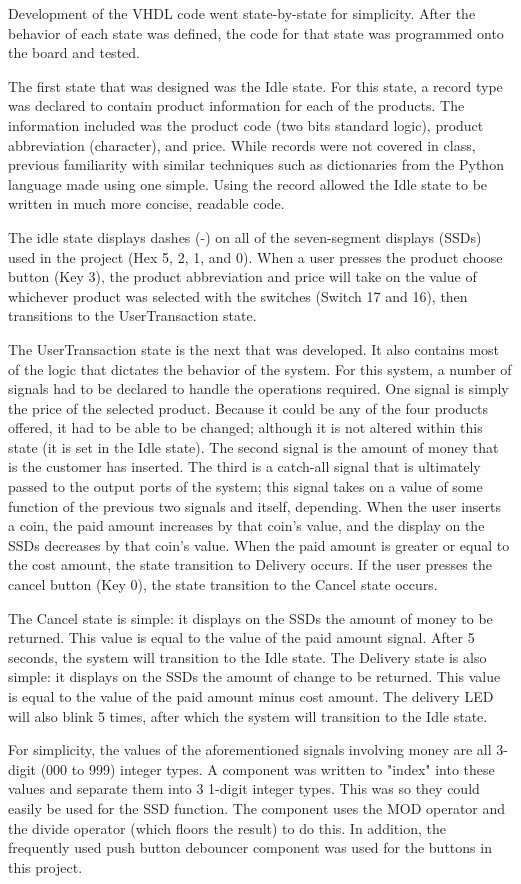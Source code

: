 \documentclass[12pt]{article}
\begin{document}
Development of the VHDL code went state-by-state for simplicity.  After the behavior of each state was defined, the code for that state was programmed onto the board and tested.\par
The first state that was designed was the Idle state.  For this state, a record type was declared to contain product information for each of the products.  The information included was the product code (two bits standard logic), product abbreviation (character), and price.  While records were not covered in class, previous familiarity with similar techniques such as dictionaries from the Python language made using one simple.  Using the record allowed the Idle state to be written in much more concise, readable code.\par
The idle state displays dashes (-) on all of the seven-segment displays (SSDs) used in the project (Hex 5, 2, 1, and 0).  When a user presses the product choose button (Key 3), the product abbreviation and price will take on the value of whichever product was selected with the switches (Switch 17 and 16), then transitions to the UserTransaction state.\par
The UserTransaction state is the next that was developed.  It also contains most of the logic that dictates the behavior of the system.  For this system, a number of signals had to be declared to handle the operations required.  One signal is simply the price of the selected product.  Because it could be any of the four products offered, it had to be able to be changed; although it is not altered within this state (it is set in the Idle state).  The second signal is the amount of money that is the customer has inserted.  The third is a catch-all signal that is ultimately passed to the output ports of the system; this signal takes on a value of some function of the previous two signals and itself, depending.  When the user inserts a coin, the paid amount increases by that coin's value, and the display on the SSDs decreases by that coin's value.  When the paid amount is greater or equal to the cost amount, the state transition to Delivery occurs.  If the user presses the cancel button (Key 0), the state transition to the Cancel state occurs.\par
The Cancel state is simple: it displays on the SSDs the amount of money to be returned.  This value is equal to the value of the paid amount signal.  After 5 seconds, the system will transition to the Idle state.  The Delivery state is also simple: it displays on the SSDs the amount of change to be returned.  This value is equal to the value of the paid amount minus cost amount.  The delivery LED will also blink 5 times, after which the system will transition to the Idle state.\par
For simplicity, the values of the aforementioned signals involving money are all 3-digit (000 to 999) integer types.  A component was written to "index" into these values and separate them into 3 1-digit integer types.  This was so they could easily be used for the SSD function.  The component uses the MOD operator and the divide operator (which floors the result) to do this.  In addition, the frequently used push button debouncer component was used for the buttons in this project.
\end{document}
